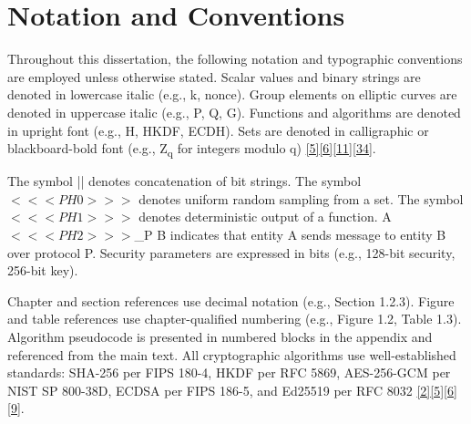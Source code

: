 \section{Notation and Conventions}

\indent Throughout this dissertation, the following notation and typographic conventions are employed unless otherwise stated. Scalar values and binary strings are denoted in lowercase italic (e.g., k, nonce). Group elements on elliptic curves are denoted in uppercase italic (e.g., P, Q, G). Functions and algorithms are denoted in upright font (e.g., H, HKDF, ECDH). Sets are denoted in calligraphic or blackboard-bold font (e.g., Z\textsubscript{q} for integers modulo q) \hyperref[ref:5]{[5]}\hyperref[ref:6]{[6]}\hyperref[ref:11]{[11]}\hyperref[ref:34]{[34]}.

\indent The symbol || denotes concatenation of bit strings. The symbol $<<<PH0>>>$ denotes uniform random sampling from a set. The symbol $<<<PH1>>>$ denotes deterministic output of a function. A $<<<PH2>>>$\_P B indicates that entity A sends message to entity B over protocol P. Security parameters are expressed in bits (e.g., 128-bit security, 256-bit key).

\indent Chapter and section references use decimal notation (e.g., Section 1.2.3). Figure and table references use chapter-qualified numbering (e.g., Figure 1.2, Table 1.3). Algorithm pseudocode is presented in numbered blocks in the appendix and referenced from the main text. All cryptographic algorithms use well-established standards: SHA-256 per FIPS 180-4, HKDF per RFC 5869, AES-256-GCM per NIST SP 800-38D, ECDSA per FIPS 186-5, and Ed25519 per RFC 8032 \hyperref[ref:2]{[2]}\hyperref[ref:5]{[5]}\hyperref[ref:6]{[6]}\hyperref[ref:9]{[9]}.

